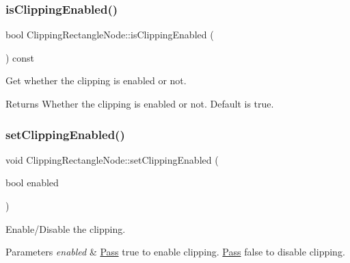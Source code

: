 \subsubsection{\texorpdfstring{is\+Clipping\+Enabled()}{isClippingEnabled()}\hspace{0.1cm}{\footnotesize\ttfamily [2/2]}}
{\footnotesize\ttfamily bool Clipping\+Rectangle\+Node\+::is\+Clipping\+Enabled (\begin{DoxyParamCaption}{ }\end{DoxyParamCaption}) const\hspace{0.3cm}{\ttfamily [inline]}}



Get whether the clipping is enabled or not. 

\begin{DoxyReturn}{Returns}
Whether the clipping is enabled or not. Default is true. 
\end{DoxyReturn}
\mbox{\label{classClippingRectangleNode_a3748322e0d2a5e082eaf2c56d74c6229}} 
\subsubsection{\texorpdfstring{set\+Clipping\+Enabled()}{setClippingEnabled()}\hspace{0.1cm}{\footnotesize\ttfamily [1/2]}}
{\footnotesize\ttfamily void Clipping\+Rectangle\+Node\+::set\+Clipping\+Enabled (\begin{DoxyParamCaption}\item[{bool}]{enabled }\end{DoxyParamCaption})\hspace{0.3cm}{\ttfamily [inline]}}



Enable/\+Disable the clipping. 


\begin{DoxyParams}{Parameters}
{\em enabled} & \hyperlink{classPass}{Pass} true to enable clipping. \hyperlink{classPass}{Pass} false to disable clipping. \\
\hline
\end{DoxyParams}
\mbox{\label{classClippingRectangleNode_a3748322e0d2a5e082eaf2c56d74c6229}} 
